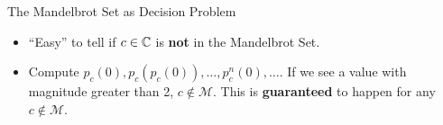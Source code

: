 \documentclass[c]{beamer}
\begin{document}
\begin{frame}{The Mandelbrot Set as Decision Problem}
  
  \begin{itemize}
  \item[] ``Easy'' to tell if $c \in \mathbb{C}$ is \textbf{not} in
    the Mandelbrot Set.

    \vspace{\baselineskip}

  \item[] Compute $p_c(0), p_c(p_c(0)), \ldots, p_c^n(0), \ldots$. If
    we see a value with magnitude greater than 2, $c \notin
    \mathcal{M}$.  This is \textbf{guaranteed} to happen for any $c
    \notin \mathcal{M}$.

  \end{itemize}
\end{frame}
\end{document}
